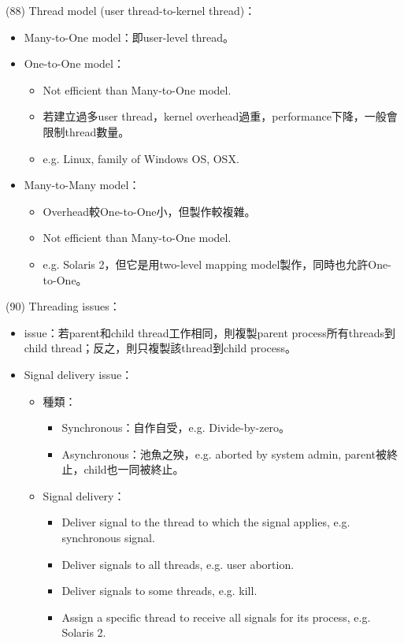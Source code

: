 \begin{theorem}{(88)} Thread model (user thread-to-kernel thread)：\begin{itemize}
        \item Many-to-One model：即user-level thread。
        \item One-to-One model：\begin{itemize}
            \item Not efficient than Many-to-One model.
            \item 若建立過多user thread，kernel overhead過重，performance下降，一般會限制thread數量。
            \item e.g. Linux, family of Windows OS, OSX.
        \end{itemize}
        \item Many-to-Many model：\begin{itemize}
            \item Overhead較One-to-One小，但製作較複雜。
            \item Not efficient than Many-to-One model.
            \item e.g. Solaris 2，但它是用two-level mapping model製作，同時也允許One-to-One。
        \end{itemize}
    \end{itemize}
\end{theorem}

\begin{theorem}{(90)} Threading issues：\begin{itemize}
        \item {} issue：若parent和child thread工作相同，則複製parent process所有threads到child thread；反之，則只複製該thread到child process。
        \item Signal delivery issue： \begin{itemize}
            \item 種類：\begin{itemize}
                \item Synchronous：自作自受，e.g. Divide-by-zero。
                \item Asynchronous：池魚之殃，e.g. aborted by system admin, parent被終止，child也一同被終止。
            \end{itemize}
            \item Signal delivery：\begin{itemize}
                \item Deliver signal to the thread to which the signal applies, e.g. synchronous signal.
                \item Deliver signals to all threads, e.g. user abortion.
                \item Deliver signals to some threads, e.g. kill.
                \item Assign a specific thread to receive all signals for its process, e.g. Solaris 2. 
            \end{itemize}
        \end{itemize}
    \end{itemize}
\end{theorem}
